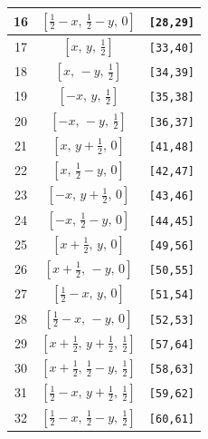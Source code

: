 \documentclass[fleqn,8pt]{jsarticle}
\begin{document}
\begin{longtable}{ccc}
16 & $\left[ \frac{1}{2} - x,\, \frac{1}{2} - y,\, 0 \right]$ & {\tt [28,29]} \\ \hline
17 & $\left[ x,\, y,\, \frac{1}{2} \right]$ & {\tt [33,40]} \\ \hline
18 & $\left[ x,\, - y,\, \frac{1}{2} \right]$ & {\tt [34,39]} \\ \hline
19 & $\left[ - x,\, y,\, \frac{1}{2} \right]$ & {\tt [35,38]} \\ \hline
20 & $\left[ - x,\, - y,\, \frac{1}{2} \right]$ & {\tt [36,37]} \\ \hline
21 & $\left[ x,\, y + \frac{1}{2},\, 0 \right]$ & {\tt [41,48]} \\ \hline
22 & $\left[ x,\, \frac{1}{2} - y,\, 0 \right]$ & {\tt [42,47]} \\ \hline
23 & $\left[ - x,\, y + \frac{1}{2},\, 0 \right]$ & {\tt [43,46]} \\ \hline
24 & $\left[ - x,\, \frac{1}{2} - y,\, 0 \right]$ & {\tt [44,45]} \\ \hline
25 & $\left[ x + \frac{1}{2},\, y,\, 0 \right]$ & {\tt [49,56]} \\ \hline
26 & $\left[ x + \frac{1}{2},\, - y,\, 0 \right]$ & {\tt [50,55]} \\ \hline
27 & $\left[ \frac{1}{2} - x,\, y,\, 0 \right]$ & {\tt [51,54]} \\ \hline
28 & $\left[ \frac{1}{2} - x,\, - y,\, 0 \right]$ & {\tt [52,53]} \\ \hline
29 & $\left[ x + \frac{1}{2},\, y + \frac{1}{2},\, \frac{1}{2} \right]$ & {\tt [57,64]} \\ \hline
30 & $\left[ x + \frac{1}{2},\, \frac{1}{2} - y,\, \frac{1}{2} \right]$ & {\tt [58,63]} \\ \hline
31 & $\left[ \frac{1}{2} - x,\, y + \frac{1}{2},\, \frac{1}{2} \right]$ & {\tt [59,62]} \\ \hline
32 & $\left[ \frac{1}{2} - x,\, \frac{1}{2} - y,\, \frac{1}{2} \right]$ & {\tt [60,61]} \\
\end{longtable}
\renewcommand{\arraystretch}{1.2}
\end{document}
